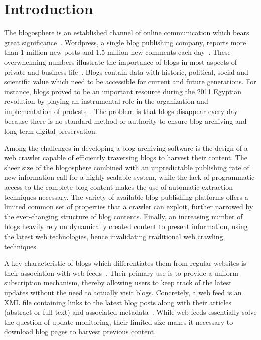\section{Introduction}

The blogosphere is an established channel of online communication which 
bears great significance~\cite{oevre2012}. Wordpress, a single blog 
publishing company, reports more than 1 million new posts and 1.5 million 
new comments each day~\cite{wordpress2014}. These overwhelming numbers 
illustrate the importance of blogs in most aspects of private and 
business life~\cite{chung2007uses}. Blogs contain data with historic, 
political, social and scientific value which need to be accessible 
for current and future generations. For instance, blogs proved to 
be an important resource during the 2011 Egyptian revolution by 
playing an instrumental role in the organization and implementation of 
protests~\cite{nahedeltantawy2012}. The problem is that blogs disappear 
every day~\cite{johnson2008blogs} because there is no standard method or 
authority to ensure blog archiving and long-term digital preservation.

Among the challenges in developing a blog archiving software
is the design of a web crawler capable of efficiently traversing blogs 
to harvest their content. The sheer size of the blogosphere combined with 
an unpredictable publishing rate of new information call for a highly 
scalable system, while the lack of programmatic access to the complete 
blog content makes the use of automatic extraction techniques necessary. 
The variety of available blog publishing platforms offers a limited 
common set of properties that a crawler can exploit, further narrowed by 
the ever-changing structure of blog contents. Finally, an increasing 
number of blogs heavily rely on dynamically created content to present 
information, using the latest web technologies, hence invalidating 
traditional web crawling techniques.

A key characteristic of blogs which differentiates them from regular 
websites is their association with web feeds~\cite{lindahl2003weblogs}. 
Their primary use is to provide a uniform subscription mechanism, thereby 
allowing users to keep track of the latest updates without the need to 
actually visit blogs. Concretely, a web feed is an XML file containing 
links to the latest blog posts along with their articles (abstract or 
full text) and associated metadata~\cite{board2007rss}. While web feeds 
essentially solve the question of update monitoring, their limited size 
makes it necessary to download blog pages to harvest previous content.

